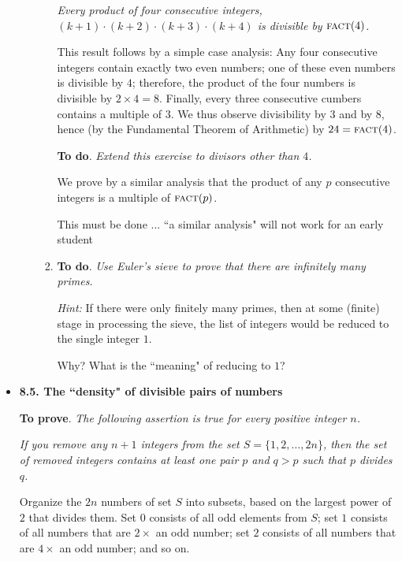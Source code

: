 \begin{itemize}
\begin{itemize}
\begin{enumerate}
{\em Every product of four consecutive integers, $(k+1) \cdot (k+2) \cdot (k+3) \cdot (k+4)$ is divisible by $\mbox{\sc fact}(4)$.}

\smallskip

This result follows by a simple case analysis:  Any four consecutive integers contain exactly two even numbers; one of these even numbers is divisible by $4$; therefore, the product of the four numbers is divisible by $2 \times 4 = 8$.  Finally, every three consecutive cumbers contains a multiple of $3$.  We thus observe divisibility by $3$ and by $8$, hence (by the Fundamental Theorem of Arithmetic) by $24 = \mbox{\sc fact}(4)$.

\smallskip

{\bf To do}. {\em Extend this exercise to divisors other than $4$.}

\smallskip

We prove by a similar analysis that the product of any $p$ consecutive integers is a multiple of $\mbox{\sc fact}(p)$.

{\Arny This must be done ... ``a similar analysis" will not work for an early student}


\medskip\item
{\bf To do}. {\em Use Euler's sieve to prove that there are infinitely many primes.}

\medskip

{\em Hint:} If there were only finitely many primes, then at some (finite) stage in processing the sieve, the list of integers would be reduced to the single integer $1$.

{\Arny Why?  What is the ``meaning" of reducing to $1$?}

\end{enumerate}
\end{itemize}

\medskip\item
{\bf 8.5. The ``density"  of divisible pairs of numbers}

\smallskip

{\bf To prove}. {\em The following assertion is true for every positive integer $n$.}
\smallskip

{\em If you remove {\em any} $n+1$ integers from the set $S = \{ 1, 2, \ldots, 2n\}$, then the set of removed integers contains at least one pair $p$ and $q > p$ such that $p$ divides $q$. }

\medskip

Organize the $2n$ numbers of set $S$ into subsets, based on the largest power of $2$ that divides them.  Set $0$ consists of all odd elements from $S$; set $1$ consists of all numbers that are $2 \times$ an odd number; set $2$ consists of all numbers that are $4 \times$ an odd number; and so on.


\end{itemize}
